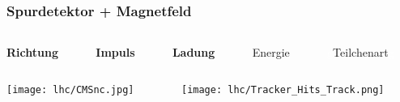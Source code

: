 \begin{frame}[t]
  \frametitle{Spurdetektor + Magnetfeld}
  \vskip0.3cm
  \begin{columns}
    \begin{column}{0.18\textwidth}
      \begin{block}{}
        \centering
        \textbf{Richtung}
      \end{block}
    \end{column}
    \begin{column}{0.025\textwidth}
    \end{column}
    \begin{column}{0.18\textwidth}
      \begin{block}{}
        \centering
        \textbf{Impuls}
      \end{block}
    \end{column}
    \begin{column}{0.025\textwidth}
    \end{column}
    \begin{column}{0.18\textwidth}
      \begin{block}{}
        \centering
        \textbf{Ladung}
      \end{block}
    \end{column}
    \begin{column}{0.025\textwidth}
    \end{column}
    \begin{column}{0.18\textwidth}
      \begin{block}{}
        \centering
        Energie
      \end{block}
    \end{column}
    \begin{column}{0.02\textwidth}
    \end{column}
    \begin{column}{0.18\textwidth}
      \begin{block}{}
        \centering
        \textcolor{white}{g}Teilchenart\textcolor{white}{g}
      \end{block}
    \end{column}
    \begin{column}{0.005\textwidth}
    \end{column}
  \end{columns}
  \vskip0.25cm
  \begin{columns}
    \begin{column}{0.4\textwidth}
      \centering
      \texttt{[image: lhc/CMSnc.jpg]}
    \end{column}
    \begin{column}{0.6\textwidth}
      \centering
      \texttt{[image: lhc/Tracker\_Hits\_Track.png]}
    \end{column}    
  \end{columns}
\end{frame}

